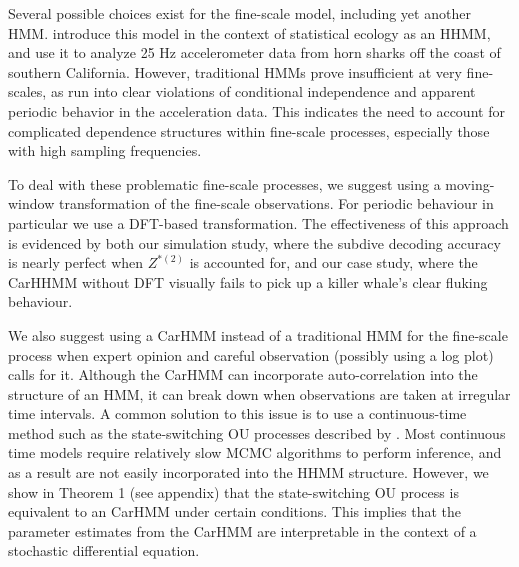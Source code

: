 Several possible choices exist for the fine-scale model, including yet another HMM. \citet{Barajas:2017} introduce this model in the context of statistical ecology as an HHMM, and \citet{Adam:2019} use it to analyze 25 Hz accelerometer data from horn sharks off the coast of southern California. However, traditional HMMs prove insufficient at very fine-scales, as \citet{Adam:2019} run into clear violations of conditional independence and apparent periodic behavior in the acceleration data. This indicates the need to account for complicated dependence structures within fine-scale processes, especially those with high sampling frequencies. 




To deal with these problematic fine-scale processes, we suggest using a moving-window transformation of the fine-scale observations. For periodic behaviour in particular we use a DFT-based transformation. The effectiveness of this approach is evidenced by both our simulation study, where the subdive decoding accuracy is nearly perfect when $Z^{*(2)}$ is accounted for, and our case study, where the CarHHMM without DFT visually fails to pick up a killer whale's clear fluking behaviour.

We also suggest using a CarHMM instead of a traditional HMM for the fine-scale process when expert opinion and careful observation (possibly using a log plot) calls for it. Although the CarHMM can incorporate auto-correlation into the structure of an HMM, it can break down when observations are taken at irregular time intervals. A common solution to this issue is to use a continuous-time method such as the state-switching OU processes described by \citet{Michelot:2019}. Most continuous time models require relatively slow MCMC algorithms to perform inference, and as a result are not easily incorporated into the HHMM structure. However, we show in Theorem 1 (see appendix) that the state-switching OU process is equivalent to an CarHMM under certain conditions. This implies that the parameter estimates from the CarHMM are interpretable in the context of a stochastic differential equation.

